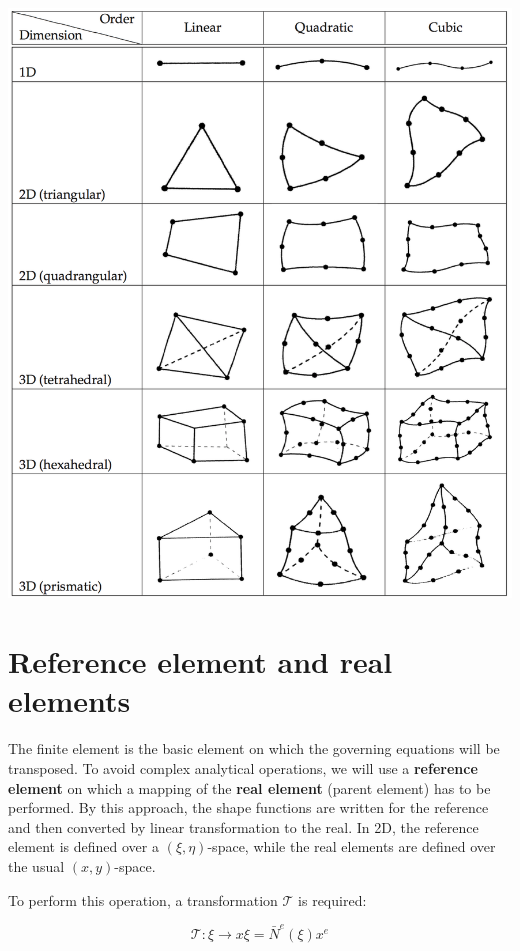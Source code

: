 	\begin{center}
	\includegraphics[scale=0.3]{ch6/3}
	\end{center}
	
\section{Reference element and real elements}
	The finite element is the basic element on which the governing equations will be transposed. To avoid complex analytical operations, we will use a \textbf{reference element} on which a mapping of the \textbf{real element} (parent element) has to be performed. By this approach, the shape functions are written for the reference and then converted by linear transformation to the real. In 2D, the reference element is defined over a $(\xi, \eta)$-space, while the real elements are defined over the usual $(x,y)$-space. 
	
	To perform this operation, a transformation $\mathcal{T}$ is required: 
	
	\begin{equation}
	\mathcal{T} : \xi \rightarrow x{\xi} = \bar{N}^e (\xi) x^e
	\end{equation}
	
